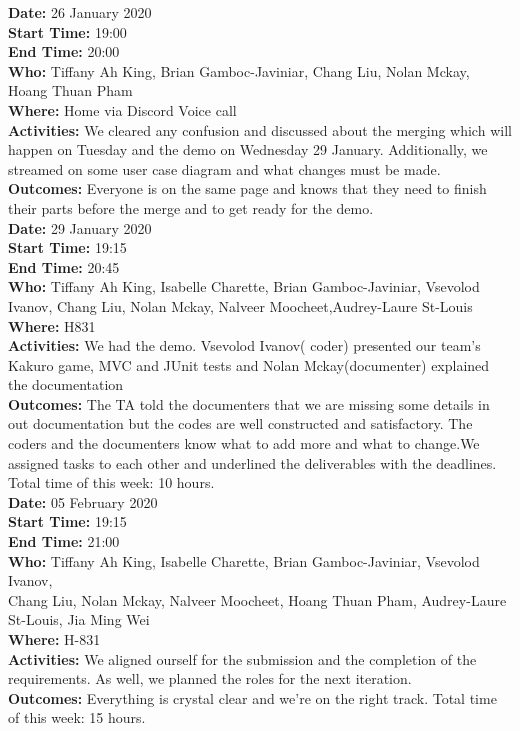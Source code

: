 \documentclass[12pt]{article}
\begin{document}
{\bf Date:} 26 January 2020\\
{\bf Start Time:} 19:00\\
{\bf End Time:} 20:00\\
{\bf Who:} Tiffany Ah King, Brian Gamboc-Javiniar,
Chang Liu, Nolan Mckay, Hoang Thuan Pham\\
{\bf Where:} Home via Discord Voice call\\
{\bf Activities:} We cleared any confusion and discussed about the merging which will happen on Tuesday and the demo on Wednesday 29 January. Additionally, we streamed on some user case diagram and what changes must be made.\\
{\bf Outcomes:} Everyone is on the same page and knows that they need to finish their parts before the merge and to get ready for the demo.\\


{\bf Date:} 29 January 2020\\
{\bf Start Time:} 19:15\\
{\bf End Time:} 20:45\\
{\bf Who:} Tiffany Ah King, Isabelle Charette, Brian Gamboc-Javiniar, Vsevolod Ivanov,
Chang Liu, Nolan Mckay, Nalveer Moocheet,Audrey-Laure St-Louis \\
{\bf Where:} H831\\
{\bf Activities:} We  had the demo. Vsevolod Ivanov( coder) presented our team's Kakuro game, MVC and JUnit tests and Nolan Mckay(documenter) explained the documentation \\
{\bf Outcomes:} The TA told the documenters that we are missing some details in out documentation but the codes are well constructed and satisfactory. The coders and the documenters know what to add more and what to change.We assigned tasks to each other and underlined the deliverables with the deadlines. Total time of this week: 10 hours.\\

{\bf Date:} 05 February 2020\\
{\bf Start Time:} 19:15\\
{\bf End Time:} 21:00\\
{\bf Who:} Tiffany Ah King, Isabelle Charette, Brian Gamboc-Javiniar, Vsevolod Ivanov,\\
Chang Liu, Nolan Mckay, Nalveer Moocheet, Hoang Thuan Pham, Audrey-Laure St-Louis, Jia Ming Wei\\
{\bf Where:} H-831\\
{\bf Activities:} We aligned ourself for the submission and the completion of the requirements. As well, we planned the roles for the next iteration.\\
{\bf Outcomes:} Everything is crystal clear and we're on the right track. Total time of this week: 15 hours.\\
\end{document}
